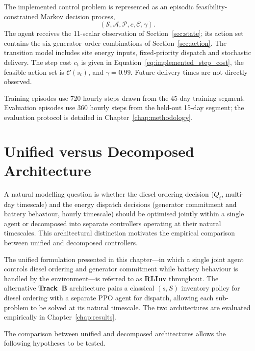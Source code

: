 \begin{revisedblock}
The implemented control problem is represented as an episodic
feasibility-constrained Markov decision process,
\[
(\mathcal S,\mathcal A,\mathcal P,c,\mathcal C,\gamma).
\]
The agent receives the 11-scalar observation of
Section~\ref{sec:state}; its action set contains the six
generator--order combinations of Section~\ref{sec:action}.
The transition model includes site energy inputs,
fixed-priority dispatch and stochastic delivery.
The step cost $c_t$ is given in
Equation~\eqref{eq:implemented_step_cost}, the feasible
action set is $\mathcal C(s_t)$, and $\gamma=0.99$.
Future delivery times are not directly observed.

Training episodes use 720 hourly steps drawn from the
45-day training segment. Evaluation episodes use 360
hourly steps from the held-out 15-day segment; the
evaluation protocol is detailed in
Chapter~\ref{chap:methodology}.
\end{revisedblock}

\section{Unified versus Decomposed Architecture}
\label{sec:unified_vs_hier}

A natural modelling question is whether the diesel ordering decision
($Q_t$, multi-day timescale) and the energy dispatch decisions (generator
commitment and battery behaviour, hourly timescale) should be optimised
jointly within a single agent or decomposed into separate controllers
operating at their natural timescales. This architectural distinction motivates the
empirical comparison between unified and
decomposed controllers.

The unified formulation presented in this chapter---in which a single
joint agent controls diesel ordering and generator commitment while battery
behaviour is handled by the environment---is referred to as \textbf{RLInv}
throughout. The alternative \textbf{Track~B} architecture pairs a classical
$(s,S)$ inventory policy for diesel ordering with a separate PPO agent for
dispatch, allowing each sub-problem to be solved at its natural timescale.
The two architectures are evaluated empirically in
Chapter~\ref{chap:results}.

The comparison between unified and decomposed architectures allows the
following hypotheses to be tested.

